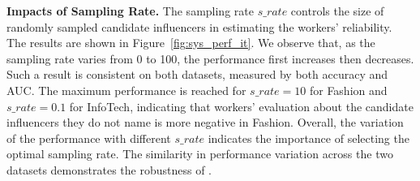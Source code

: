 \smallskip
\noindent\textbf{Impacts of Sampling Rate.}
The sampling rate $s\_rate$ controls the size of randomly sampled candidate influencers in estimating the workers' reliability. The results are shown in Figure~\ref{fig:sys_perf_it}. We observe that, as the sampling rate varies from 0 to 100, the performance first increases then decreases. Such a result is consistent on both datasets, measured by both accuracy and AUC. The maximum performance is reached for $s\_rate= 10$ for Fashion and $s\_rate= 0.1$ for InfoTech, indicating that workers' evaluation about the candidate influencers they do not name is more negative in Fashion. Overall, the variation of the performance with different $s\_rate$ indicates the importance of selecting the optimal sampling rate. The similarity in performance variation across the two datasets demonstrates the robustness of \sys.

